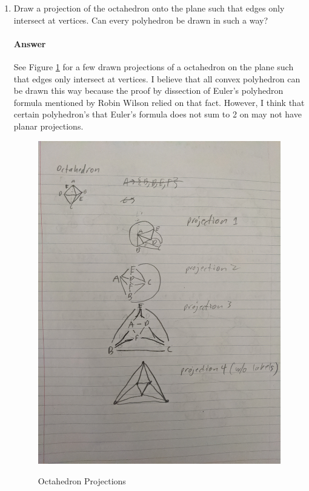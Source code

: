 \documentclass{article}
\begin{document}
\begin{enumerate}
    \item Draw a projection of the octahedron onto the plane such that edges only
        intersect at vertices.  Can every polyhedron be drawn in such a way?

        \paragraph{Answer}
        See Figure \ref{graph} for a few drawn projections of a octahedron on the plane such that edges only intersect at vertices. I believe that all convex polyhedron can be drawn this way because the proof by dissection of Euler's polyhedron formula mentioned by Robin Wilson relied on that fact. However, I think that certain polyhedron's that Euler's formula does not sum to 2 on may not have planar projections.
        
\begin{figure}
\caption{Octahedron Projections}
\centering
\includegraphics[width=\textwidth,angle=-90]{images/octahedron}
\label{graph}
\end{figure}



\end{enumerate}
\end{document}

